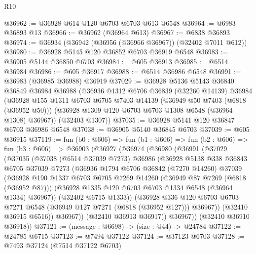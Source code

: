 \begin{lexlean}{R10}
\begin{coremodule}
@36962 := @36928 @614 @120 @6703 @6703 @613 @6548
@36964 := @6983 @36893 @13
@36966 := @36962 (@36964 @613)
@36967 := @6838 @36893
@36974 := @36934 (@36942 (@36956 (@36966 @36967)) (@32402 @7011 @612))
@36980 := @36928 @5145 @120 @36852 @6703 @36919 @6548
@36983 := @36905 @5144 @36850 @6703
@36984 := @605 @36913
@36985 := @6514 @36984
@36986 := @605 @36917
@36988 := @6514 @36986 @6548
@36991 := @36983 (@36985 @36988) @36919
@37029 := @36928
    @5136
    @5143
    @36840
    @36849
    @36984
    @36988
    (@36936
      @1312
      @6706
      @36839
      (@32260 @14139)
      @36984
      (@36928
        @155
        @1311
        @6703
        @6705
        @7403
        @14139
        (@36949 @50 @7403 (@6818 (@36952 @50)))
        (@36928 @1309 @120 @6703 @6703 @1308 @6548 (@36964 @1308) @36967))
      (@32403 @1307))
@37035 := @36928 @5141 @120 @36847 @6703 @36986 @6548
@37038 := @36905 @5140 @36845 @6703
@37039 := @605 @36915
@37119 := fun (b0 : @606) =>
  fun (b1 : @606) =>
  fun (b2 : @606) =>
  fun (b3 : @606) =>
  @36903
    (@36927
      (@36974
        (@36980
          (@36991
            (@37029
              (@37035
                (@37038
                  (@6514 @37039 @7273)
                  @36986
                  (@36928
                    @5138
                    @338
                    @36843
                    @6705
                    @37039
                    @7273
                    (@36936
                      @1794
                      @6706
                      @36842
                      (@7270 @14260)
                      @37039
                      (@36928
                        @190
                        @1337
                        @6703
                        @6705
                        @7269
                        @14260
                        (@36949 @87 @7269 (@6818 (@36952 @87)))
                        (@36928 @1335 @120 @6703 @6703 @1334 @6548 (@36964 @1334) @36967))
                      (@32402 @6715 @1333))
                    (@36928
                      @336
                      @120
                      @6703
                      @6703
                      @7271
                      @6548
                      (@36949 @127 @7271 (@6818 (@36952 @127)))
                      @36967))
                  (@32410 @36915 @6516))
                @36967))
            (@32410 @36913 @36917))
          @36967))
      (@32410 @36910 @36918))
@37121 := (message : @6698) -> (size : @44) -> @24784
@37122 := @24785 @6715
@37123 := @7494 @37122
@37124 := @37123 @6703
@37128 := @7493 @37124 (@7514 @37122 @6703)

\end{coremodule}
\end{lexlean}
